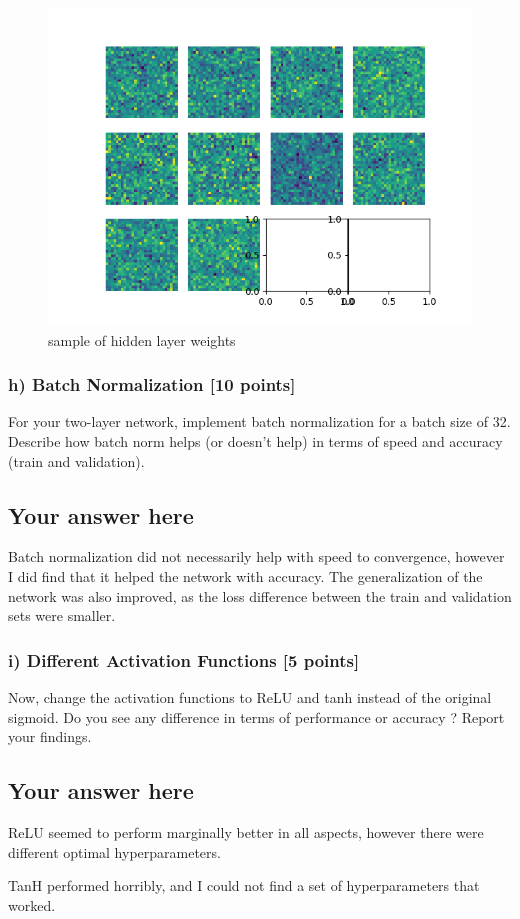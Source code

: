 \documentclass{article}
\begin{document}
\begin{figure}
\centering
\includegraphics[width=.7\linewidth]{gweights.png}
\caption{sample of hidden layer weights}
\label{fig:weights3}
\end{figure}

\subsubsection*{h) Batch Normalization [10 points]}

For your two-layer network, implement batch normalization for a batch size of 32. Describe how batch norm helps (or doesn't help) in terms of speed and accuracy (train and validation). 


\subsection*{Your answer here}
Batch normalization did not necessarily help with speed to convergence, however I did find that it helped the network with accuracy. The generalization of the network was also improved, as the loss difference between the train and validation sets were smaller.

\subsubsection*{i) Different Activation Functions [5 points]}

Now, change the activation functions to ReLU and tanh instead of the original sigmoid. Do you see any difference in terms of performance or accuracy ? Report your findings.

\subsection*{Your answer here}

ReLU seemed to perform marginally better in all aspects, however there were different optimal hyperparameters.

TanH performed horribly, and I could not find a set of hyperparameters that worked.
\end{document}
